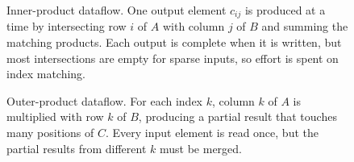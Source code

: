 \newcommand{\dfcell}[5]{%
  \fill[#5] ({#1+#4*0.45},{#2-(#3+1)*0.45}) rectangle ++(0.45,0.45);}

\newcommand{\dfmat}[3]{%
  \draw[mgrid] (#1,{#2-2.25}) grid ({#1+2.25},#2);
  \draw[black, thick] (#1,#2) rectangle ++(2.25,-2.25);
  \node[lbl] at ({#1+1.125},{#2-2.55}) {#3};}

\begin{figure}[t]
\centering
{}
\caption{Inner-product dataflow. One output element $c_{ij}$ is produced at a time by intersecting row $i$ of $A$ with column $j$ of $B$ and summing the matching products. Each output is complete when it is written, but most intersections are empty for sparse inputs, so effort is spent on index matching.}
\label{fig:df-inner}
\end{figure}

\begin{figure}[t]
\centering
{}
\caption{Outer-product dataflow. For each index $k$, column $k$ of $A$ is multiplied with row $k$ of $B$, producing a partial result that touches many positions of $C$. Every input element is read once, but the partial results from different $k$ must be merged.}
\label{fig:df-outer}
\end{figure}


